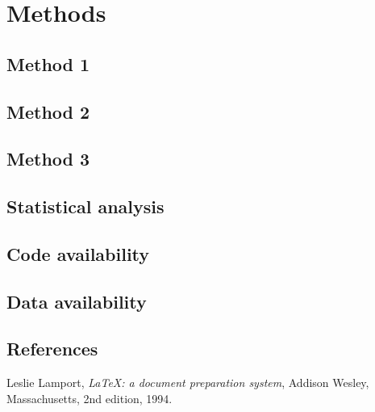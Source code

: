 \documentclass[twocolumn, linenumbers, superscriptaddress]{revtex4-1}
\begin{document}
	\section*{Methods}
		\subsection*{Method 1}
			
		\subsection*{Method 2}

		\subsection*{Method 3}
			
		\subsection*{Statistical analysis}
			
		\subsection*{Code availability}
			
		\subsection*{Data availability}

	\begin{thebibliography}{50}
		\section*{References}	
			Leslie Lamport,
			\textit{\LaTeX: a document preparation system},
			Addison Wesley, Massachusetts,
			2nd edition,
			1994.

	\end{thebibliography}
\end{document}
